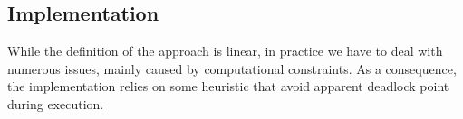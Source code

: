 \subsection{Implementation}

While the definition of the approach is linear, in practice we have to deal with numerous issues, mainly caused by computational constraints. As a consequence, the implementation relies on some heuristic that avoid apparent deadlock point during execution.

\pagebreak

